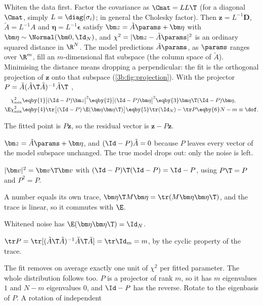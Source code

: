 Whiten the data first. Factor the covariance as $\Cmat=LL\T$ (for a
diagonal $\Cmat$, simply $L=\diag(\sigma_i)$; in general the Cholesky
factor). Then $\bm z=L^{-1}\bm D$, $\tilde A=L^{-1}A$ and
$\bm\eta=L^{-1}\bm\epsilon$ satisfy $\bm z=\tilde A\params+\bm\eta$ with
$\bm\eta\sim\Normal(\bm0,\Id_N)$, and
$\chi^2=|\bm z-\tilde A\params|^2$ is an ordinary squared distance in
$\R^N$. The model predictions $\tilde A\params$, as $\params$ ranges over
$\R^m$, fill an $m$-dimensional flat subspace (the column space of
$\tilde A$). Minimising the distance means dropping a perpendicular:
the fit is the orthogonal projection of $\bm z$ onto that subspace
(\cref{3b:fig:projection}). With the projector
$P=\tilde A(\tilde A\T\tilde A)^{-1}\tilde A\T$
,
\begin{align}
  \chi^2_{\min}
  &\eqby{1}\bigl|(\Id-P)\bm z\bigr|^2
  \eqby{2}\bigl|(\Id-P)\bm\eta\bigr|^2
  \eqby{3}\bm\eta\T(\Id-P)\bm\eta ,
  \nonumber\\
  \E\chi^2_{\min}
  &\eqby{4}\tr\bigl[(\Id-P)\,\E(\bm\eta\bm\eta\T)\bigr]
  \eqby{5}\tr(\Id_N)-\tr P
  \eqby{6}N-m\equiv\dof .
  \label{3b:eq:chi2-min-mean}
\end{align}
\begin{explain}
  \item The fitted point is $P\bm z$, so the residual vector is
        $\bm z-P\bm z$.
  \item $\bm z=\tilde A\params+\bm\eta$, and $(\Id-P)\tilde A=0$ because
        $P$ leaves every vector of the model subspace unchanged. The true
        model drops out: only the noise is left.
  \item $|\bm v|^2=\bm v\T\bm v$ with $(\Id-P)\T(\Id-P)=\Id-P$, using
        $P\T=P$ and $P^2=P$.
  \item A number equals its own trace, $\bm\eta\T M\bm\eta=\tr(M\bm\eta\bm\eta\T)$,
        and the trace is linear, so it commutes with $\E$.
  \item Whitened noise has $\E(\bm\eta\bm\eta\T)=\Id_N$.
  \item $\tr P=\tr[(\tilde A\T\tilde A)^{-1}\tilde A\T\tilde A]=\tr\Id_m=m$,
        by the cyclic property of the trace.
\end{explain}
The fit removes on average exactly one unit of $\chi^2$ per fitted
parameter. The whole distribution follows too. $P$ is a projector of rank
$m$, so it has $m$ eigenvalues $1$ and $N-m$ eigenvalues $0$, and $\Id-P$
has the reverse. Rotate to the eigenbasis of $P$. A rotation of independent
